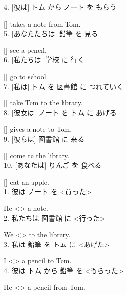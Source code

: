 \documentclass[uplatex,
paper=a4,
fontsize=18pt,
jafontsize=16pt,
number_of_lines=30,
line_length=30zh,
baselineskip=25pt,
]{jlreq}
\begin{document}
4.  [彼は] トム から ノート を もらう

  [\hspace{3em}] takes a note from Tom.
\\

5.  [あなたたちは] 鉛筆 を 見る

  [\hspace{3em}] see a pencil.
\\

6.  [私たちは] 学校 に 行く

  [\hspace{3em}] go to school.
\\

7.  [私は] トム を 図書館 に つれていく

  [\hspace{3em}] take Tom to the library.
\\

8.  [彼女は] ノート を トム に あげる

  [\hspace{3em}] gives a note to Tom.
\\

9.  [彼らは] 図書館 に 来る

  [\hspace{3em}] come to the library.
\\

10.  [あなたは] りんご を 食べる

  [\hspace{3em}] eat an apple.
\\


\newpage
{}
1.  彼は ノート を <買った>

  He <\hspace{3em}> a note.
\\

2.  私たちは 図書館 に <行った>

  We <\hspace{3em}> to the library.
\\

3.  私は 鉛筆 を トム に <あげた>

  I <\hspace{3em}> a pencil to Tom.
\\

4.  彼は トム から 鉛筆 を <もらった>

  He <\hspace{3em}> a pencil from Tom.
\\
\end{document}

